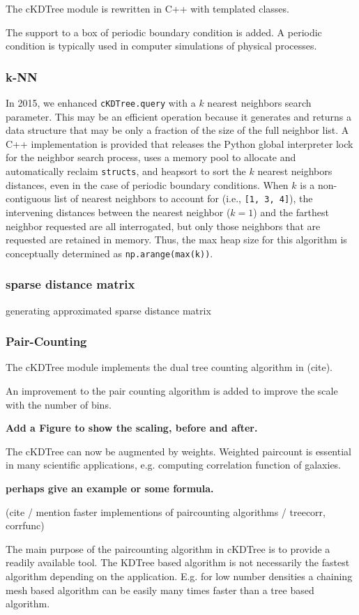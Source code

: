 The cKDTree module is rewritten in C++ with templated classes.

The support to a box of periodic boundary condition is added. A periodic
condition is typically used in computer simulations of physical processes.

\subsubsection{k-NN}

In 2015, we enhanced \texttt{cKDTree.query} with a $k$ nearest neighbors search
parameter. This may be an efficient operation\cite{Sproull:1991:RNS:3118219.3118331} 
because it generates and returns a data structure that may be only a fraction 
of the size of the full neighbor list. A C++ implementation is provided that releases
the Python global interpreter lock for the neighbor search process, uses
a memory pool to allocate and automatically reclaim \texttt{structs}, and
heapsort to sort the $k$ nearest neighbors distances, even in the case
of periodic boundary conditions. When $k$ is a non-contiguous list of nearest
neighbors to account for (i.e., \texttt{[1, 3, 4]}), the intervening distances
between the nearest neighbor ($k = 1$) and the farthest neighbor requested
are all interrogated, but only those neighbors that are requested are retained
in memory. Thus, the max heap size for this algorithm is conceptually determined
as \texttt{np.arange(max(k))}.

\subsubsection{sparse distance matrix}

generating approximated sparse distance matrix

\subsubsection{Pair-Counting}

The cKDTree module implements the dual tree counting algorithm in (cite).

An improvement to the pair counting algorithm is added to improve the scale
with the number of bins.

\textbf{Add a Figure to show the scaling, before and after.}

The cKDTree can now be augmented by weights. Weighted paircount is essential
in many scientific applications, e.g. computing correlation function of galaxies.

\textbf{perhaps give an example or some formula.}

(cite / mention faster implementions of paircounting algorithms / treecorr, corrfunc)

The main purpose of the paircounting algorithm in cKDTree is to provide a readily
available tool. The KDTree based algorithm is not necessarily the fastest algorithm
depending on the application. E.g. for low number densities a chaining mesh based algorithm
can be easily many times faster than a tree based algorithm.

